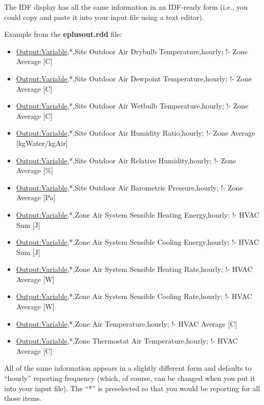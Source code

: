 The IDF display has all the same information in an IDF-ready form (i.e., you could copy and paste it into your input file using a text editor).

Example from the \textbf{eplusout.rdd} file:

\begin{itemize}
\item
  \hyperref[outputvariable]{Output:Variable},*,Site Outdoor Air Drybulb Temperature,hourly; !- Zone Average {[}C{]}
\item
  \hyperref[outputvariable]{Output:Variable},*,Site Outdoor Air Dewpoint Temperature,hourly; !- Zone Average {[}C{]}
\item
  \hyperref[outputvariable]{Output:Variable},*,Site Outdoor Air Wetbulb Temperature,hourly; !- Zone Average {[}C{]}
\item
  \hyperref[outputvariable]{Output:Variable},*,Site Outdoor Air Humidity Ratio,hourly; !- Zone Average {[}kgWater/kgAir{]}
\item
  \hyperref[outputvariable]{Output:Variable},*,Site Outdoor Air Relative Humidity,hourly; !- Zone Average {[}\%{]}
\item
  \hyperref[outputvariable]{Output:Variable},*,Site Outdoor Air Barometric Pressure,hourly; !- Zone Average {[}Pa{]}
\item
  \hyperref[outputvariable]{Output:Variable},*,Zone Air System Sensible Heating Energy,hourly; !- HVAC Sum {[}J{]}
\item
  \hyperref[outputvariable]{Output:Variable},*,Zone Air System Sensible Cooling Energy,hourly; !- HVAC Sum {[}J{]}
\item
  \hyperref[outputvariable]{Output:Variable},*,Zone Air System Sensible Heating Rate,hourly; !- HVAC Average {[}W{]}
\item
  \hyperref[outputvariable]{Output:Variable},*,Zone Air System Sensible Cooling Rate,hourly; !- HVAC Average {[}W{]}
\item
  \hyperref[outputvariable]{Output:Variable},*,Zone Air Temperature,hourly; !- HVAC Average {[}C{]}
\item
  \hyperref[outputvariable]{Output:Variable},*,Zone Thermostat Air Temperature,hourly; !- HVAC Average {[}C{]}
\end{itemize}

All of the same information appears in a slightly different form and defaults to ``hourly'' reporting frequency (which, of course, can be changed when you put it into your input file). The ``*'' is preselected so that you would be reporting for all those items.